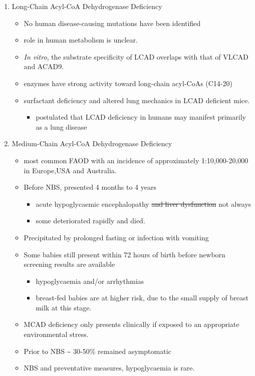 \documentclass{scrartcl}
\begin{document}
\begin{enumerate}
\item Long-Chain Acyl-CoA Dehydrogenase Deficiency
\label{sec:orgda4e400}
\begin{itemize}
\item No human disease-causing mutations have been identified
\item role  in  human  metabolism  is unclear.
\item \emph{In vitro}, the substrate specificity of LCAD overlaps with that of
VLCAD and ACAD9.
\item enzymes have strong activity toward long-chain acyl-CoAs (C14-20)
\item surfactant deficiency and altered lung mechanics in LCAD deficient
mice.
\begin{itemize}
\item postulated that LCAD deficiency in humans may manifest primarily
as a lung disease
\end{itemize}
\end{itemize}
\item Medium-Chain Acyl-CoA Dehydrogenase Deficiency
\label{sec:orgee0d403}
\begin{itemize}
\item most common FAOD with an incidence of approximately 1:10,000-20,000
in Europe,USA and Australia.
\item Before NBS, presented 4 months to 4 years
\begin{itemize}
\item acute hypoglycaemic encephalopathy \sout{and liver dysfunction} not always
\item some deteriorated rapidly and died.
\end{itemize}
\item Precipitated by prolonged fasting or infection with vomiting
\item Some babies still present within 72 hours of birth before
newborn screening results are available
\begin{itemize}
\item hypoglycaemia and/or arrhythmias
\item breast-fed babies are at higher risk, due to the small supply of
breast milk at this stage.
\end{itemize}
\item MCAD deficiency only presents clinically if exposed to an
appropriate environmental stress.
\item Prior to NBS \textasciitilde{} 30-50\% remained asymptomatic
\item NBS and preventative measures, hypoglycaemia is rare.

\end{itemize}
\end{enumerate}
\end{document}
